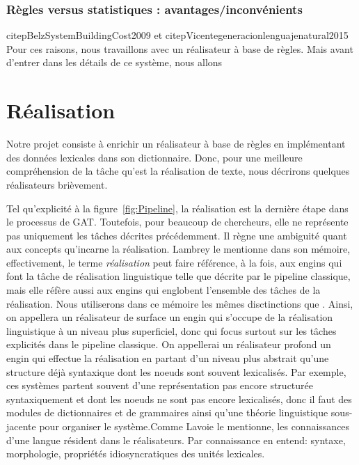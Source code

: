\subsubsection{Règles versus statistiques : avantages/inconvénients}
citep{BelzSystemBuildingCost2009} et citep{Vicentegeneracionlenguajenatural2015}
Pour ces raisons, nous travaillons avec un réalisateur à base de règles. Mais avant d'entrer dans les détails de ce système, nous allons 

\section{Réalisation}

Notre projet consiste à enrichir un réalisateur à base de règles en implémentant des données lexicales dans son dictionnaire. Donc, pour une meilleure compréhension de la tâche qu'est la réalisation de texte, nous décrirons quelques réalisateurs brièvement. 

Tel qu'explicité à la figure~\ref{fig:Pipeline}, la réalisation est la dernière étape dans le processus de \ac{GAT}. Toutefois, pour beaucoup de chercheurs, elle ne représente pas uniquement les tâches décrites précédemment. Il règne une ambiguité quant aux concepts qu'incarne la réalisation. Lambrey le mentionne \citep{LambreyImplementationcollocationspour2017} dans son mémoire, effectivement, le terme \emph{réalisation} peut faire référence, à la fois, aux engins qui font la tâche de réalisation linguistique telle que décrite par le pipeline classique, mais elle réfère aussi aux engins qui englobent l'ensemble des tâches de la réalisation. Nous utiliserons dans ce mémoire les mêmes disctinctions que \citep{LambreyImplementationcollocationspour2017}. Ainsi, on appellera un réalisateur de surface un engin qui s'occupe de la réalisation linguistique à un niveau plus superficiel, donc qui focus surtout sur les tâches explicités dans le pipeline classique. On appellerai un réalisateur profond un engin qui effectue la réalisation en partant d'un niveau plus abstrait qu'une structure déjà syntaxique dont les noeuds sont souvent lexicalisés. Par exemple, ces systèmes partent souvent d'une représentation pas encore structurée syntaxiquement et dont les noeuds ne sont pas encore lexicalisés, donc il faut des modules de dictionnaires et de grammaires ainsi qu'une théorie linguistique sous-jacente pour organiser le système.Comme Lavoie le mentionne\citep{LavoieFastPortableRealizer1997}, les connaissances d'une langue résident dans le réalisateurs. Par connaissance en entend: syntaxe, morphologie, propriétés idiosyncratiques des unités lexicales. 

